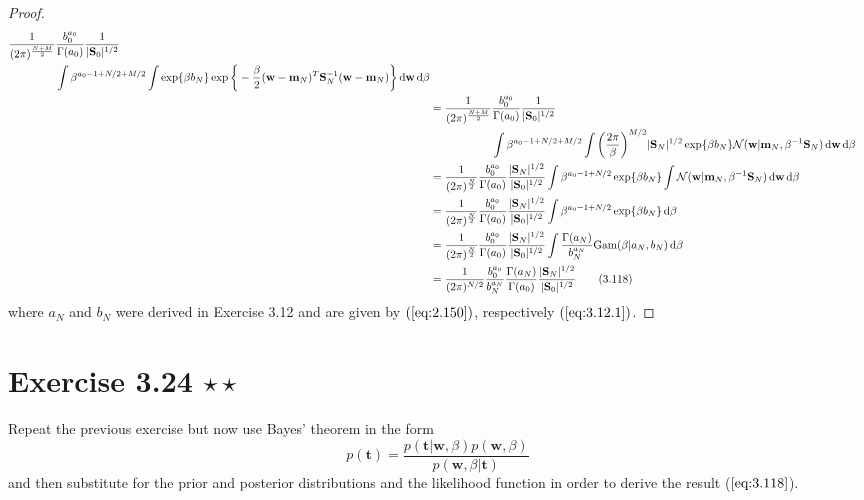 \begin{proof}
\begin{align*}
\begin{aligned}[t]
            \frac{1}{(2\pi)^{\frac{N + M}{2}}} &
            \frac{b_0^{a_0}}{\Gamma(a_0)}
            \frac{1}{|\mathbf{S}_0|^{1/2}} \\
                                               & \int \beta^{a_0 - 1 + N/2 + M/2} 
            \int \exp{\beta b_N}\exp\bigg\{-\frac{\beta}{2}(\mathbf{w} 
                - \mathbf{m}_N)^T\mathbf{S}_N^{-1}
            (\mathbf{w} - \mathbf{m}_N)\bigg\} \diff \mathbf{w} \diff \beta 
        \end{aligned} \\
        &= \begin{aligned}[t]
            \frac{1}{(2\pi)^{\frac{N + M}{2}}} &
            \frac{b_0^{a_0}}{\Gamma(a_0)}
            \frac{1}{|\mathbf{S}_0|^{1/2}}  \\
                                               & \int \beta^{a_0 - 1+ N/2 + M/2} 
            \int \bigg(\frac{2\pi}{\beta}\bigg)^{M/2} |\mathbf{S}_N|^{1/2}  
            \exp\{\beta b_N\}
            \mathcal{N}(\mathbf{w} | \mathbf{m}_N, \beta^{-1}\mathbf{S}_N)
            \diff \mathbf{w} \diff \beta \\
        \end{aligned} \\
        &= \frac{1}{(2\pi)^{\frac{N}{2}}}\frac{b_0^{a_0}}{\Gamma(a_0)}
        \frac{|\mathbf{S}_N|^{1/2}}{|\mathbf{S}_0|^{1/2}} 
        \int \beta^{a_0 - 1 + N/2} 
        \exp\{\beta b_N\}
        \int\mathcal{N}(\mathbf{w} | \mathbf{m}_N, \beta^{-1}\mathbf{S}_N)
        \diff \mathbf{w} \diff \beta \\
        &= \frac{1}{(2\pi)^{\frac{N}{2}}}\frac{b_0^{a_0}}{\Gamma(a_0)}
        \frac{|\mathbf{S}_N|^{1/2}}{|\mathbf{S}_0|^{1/2}} 
        \int \beta^{a_0 - 1 + N/2} 
        \exp\{\beta b_N\} \diff \beta \\
        &= \frac{1}{(2\pi)^{\frac{N}{2}}}\frac{b_0^{a_0}}{\Gamma(a_0)}
        \frac{|\mathbf{S}_N|^{1/2}}{|\mathbf{S}_0|^{1/2}} 
        \int\frac{\Gamma(a_N)}{b_N^{a_N}} \text{Gam}(\beta | a_N, b_N) \diff \beta \\
        &= \frac{1}{(2\pi)^{N / 2}} \frac{b_0^{a_0}}{b_N^{a_N}}
        \frac{\Gamma(a_N)}{\Gamma(a_0)} \frac{|\mathbf{S}_N|^{1/2}}{|\mathbf{S}_0|^{1/2}}
        \tag{3.118}
    \end{align*}
    where $a_N$ and $b_N$ were derived in Exercise 3.12 and are
    given by $(\ref{eq:2.150})$, respectively $(\ref{eq:3.12.1})$.
\end{proof}

\section*{Exercise 3.24 $\star \star$}
Repeat the previous exercise but now use Bayes' theorem in 
the form
\begin{equation*}
    p(\mathbf{t}) 
    = \frac{p(\mathbf{t} | \mathbf{w}, \beta)p(\mathbf{w}, \beta)}
        {p(\mathbf{w}, \beta | \mathbf{t})}
    \tag{3.119}\label{eq:3.119}
\end{equation*}
and then substitute for the prior and posterior distributions and 
the likelihood function in order to derive the result ($\ref{eq:3.118}$).

